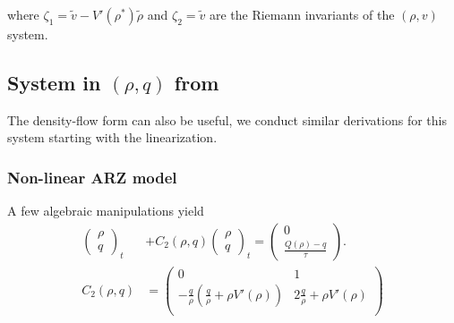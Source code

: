 \documentclass[letterpaper, 10 pt, conference]{ieeeconf}  %
\begin{document}
where
{\footnotesize
$\zeta_1 = \tilde{v} - V'( \rho^* )\tilde{\rho}$ and $\zeta_2 = \tilde{v}$
}
are the Riemann invariants of the $(\rho, v)$ system.


\subsection{System in $(\rho, q)$ from}
The density-flow form can also be useful, we conduct similar derivations for this system starting with the linearization.

\subsubsection{Non-linear ARZ model}
A few algebraic manipulations yield
{\footnotesize
\begin{subequations}
\begin{align}
\begin{pmatrix}
	\rho \\
	q
\end{pmatrix}_t 
&+
C_2\left(\rho, q\right)
\begin{pmatrix}
	\rho \\ 
	q
\end{pmatrix}_t
=
\begin{pmatrix}
	0 \\ 
	\frac{Q(\rho) - q}{\tau}
\end{pmatrix}. \label{ARZrhoq} \\
C_2 \left(\rho, q \right)
&= 
\begin{pmatrix}
	0 & 1 \\
	- \frac{q}{\rho} \left( \frac{q}{\rho} + \rho V'\left( \rho \right) \right) & 2 \frac{q}{\rho} + \rho V'\left( \rho \right) \\
\end{pmatrix}
\end{align}
\end{subequations}
}
\end{document}
